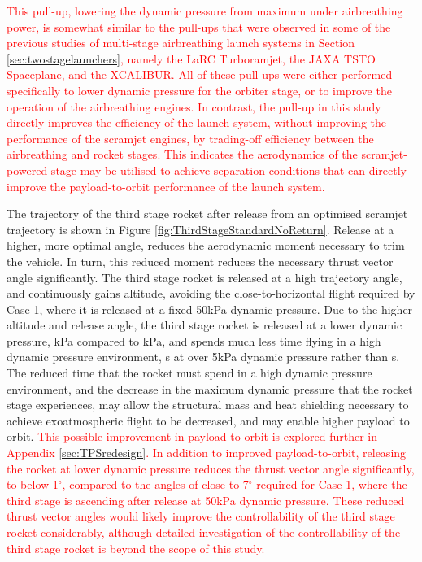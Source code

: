 \textcolor{red}{
 This pull-up, lowering the dynamic pressure from maximum under airbreathing power, is somewhat similar to the pull-ups that were observed in some of the previous studies of multi-stage airbreathing launch systems in Section \ref{sec:twostagelaunchers}, namely the LaRC Turboramjet\cite{Wilhite1991}, the JAXA TSTO Spaceplane\cite{Fujikawa2017}, and the XCALIBUR\cite{Bradford2002}. All of these pull-ups were either performed specifically to lower dynamic pressure for the orbiter stage\cite{Wilhite1991,Bradford2002}, or to improve the operation of the airbreathing engines\cite{Fujikawa2017}. In contrast, the pull-up in this study directly improves the efficiency of the launch system, without improving the performance of the scramjet engines, by trading-off efficiency between the airbreathing and rocket stages. This indicates the aerodynamics of the scramjet-powered stage may be utilised to achieve separation conditions that can directly improve the payload-to-orbit performance of the launch system. }

The trajectory of the third stage rocket after release from an optimised scramjet trajectory is shown in Figure \ref{fig:ThirdStageStandardNoReturn}. Release at a higher, more optimal angle, reduces the aerodynamic moment necessary to trim the vehicle. In turn, this reduced moment reduces the necessary thrust vector angle significantly. The third stage rocket is released at a high trajectory angle, and continuously gains altitude, avoiding the close-to-horizontal flight required by Case 1, where it is released at a fixed 50kPa dynamic pressure.
Due to the higher altitude and release angle, the third stage rocket is released at a lower dynamic pressure, \secondthirdSeparationqCdStandardNoReturn kPa compared to \secondthirdSeparationqConstqNoReturn kPa, and spends much less time flying in a high dynamic pressure environment, \thirdqOverFiveStandard s at over 5kPa dynamic pressure rather than \thirdqOverFiveConstqNoReturn s. 
The reduced time that the rocket must spend in a high dynamic pressure environment, and the decrease in the maximum dynamic pressure that the rocket stage experiences, may allow the structural mass and heat shielding necessary to achieve exoatmospheric flight to be decreased, and may enable higher payload to orbit. \textcolor{red}{This possible improvement in payload-to-orbit is explored further in Appendix \ref{sec:TPSredesign}. In addition to improved payload-to-orbit, releasing the rocket at lower dynamic pressure reduces the thrust vector angle significantly, to below 1$^\circ$, compared to the angles of close to 7$^\circ$ required for Case 1, where the third stage is ascending after release at 50kPa dynamic pressure. These reduced thrust vector angles would likely improve the controllability of the third stage rocket considerably, although detailed investigation of the controllability of the third stage rocket is beyond the scope of this study.} 


